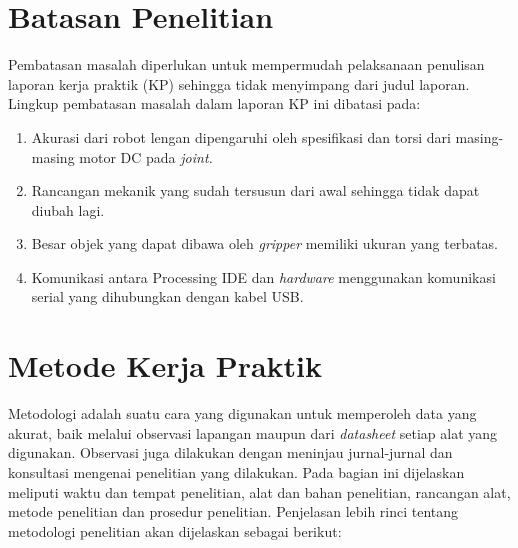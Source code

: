 	
\section{Batasan Penelitian}
	Pembatasan masalah diperlukan untuk mempermudah pelaksanaan penulisan laporan kerja praktik (KP) sehingga tidak menyimpang dari judul laporan. Lingkup pembatasan masalah dalam laporan KP ini dibatasi pada:
	
	\begin{enumerate}
		
		\item Akurasi dari robot lengan dipengaruhi oleh spesifikasi dan torsi dari masing-masing motor DC pada \emph{ joint.}
		\item  Rancangan mekanik yang sudah tersusun dari awal sehingga tidak dapat diubah lagi. 
		\item Besar objek yang dapat dibawa oleh \textit{gripper} memiliki ukuran yang terbatas.
		\item Komunikasi antara Processing IDE dan \textit{hardware} menggunakan komunikasi serial yang dihubungkan dengan kabel USB.
		
	\end{enumerate}

\section{Metode Kerja Praktik}
Metodologi adalah suatu cara yang digunakan untuk memperoleh data yang akurat, baik melalui observasi lapangan maupun dari \emph {datasheet} setiap alat yang digunakan. Observasi juga dilakukan dengan meninjau jurnal-jurnal dan konsultasi mengenai penelitian yang dilakukan. Pada bagian ini dijelaskan meliputi waktu dan tempat penelitian, alat dan bahan penelitian, rancangan alat, metode penelitian dan prosedur penelitian. Penjelasan lebih rinci tentang metodologi penelitian akan dijelaskan sebagai berikut: 

